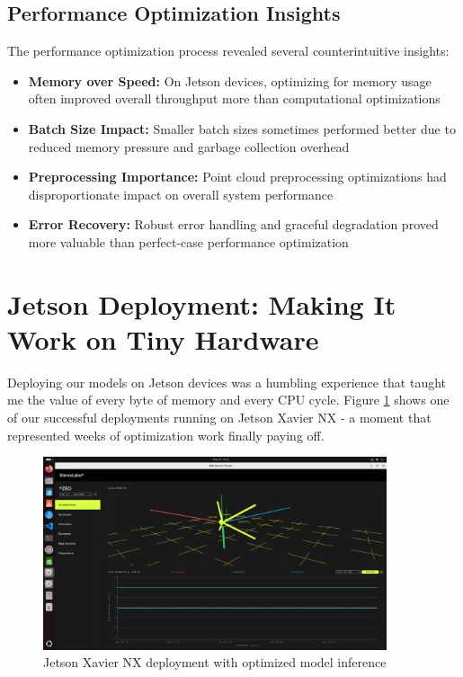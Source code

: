 \documentclass[12pt,a4paper]{report}
\begin{document}
\subsection{Performance Optimization Insights}

The performance optimization process revealed several counterintuitive insights:

\begin{itemize}
    \item \textbf{Memory over Speed:} On Jetson devices, optimizing for memory usage often improved overall throughput more than computational optimizations
    \item \textbf{Batch Size Impact:} Smaller batch sizes sometimes performed better due to reduced memory pressure and garbage collection overhead
    \item \textbf{Preprocessing Importance:} Point cloud preprocessing optimizations had disproportionate impact on overall system performance
    \item \textbf{Error Recovery:} Robust error handling and graceful degradation proved more valuable than perfect-case performance optimization
\end{itemize}

\section{Jetson Deployment: Making It Work on Tiny Hardware}

Deploying our models on Jetson devices was a humbling experience that taught me the value of every byte of memory and every CPU cycle. Figure \ref{fig:jetson_deployment} shows one of our successful deployments running on Jetson Xavier NX - a moment that represented weeks of optimization work finally paying off.

\begin{figure}[htbp]
    \centering
    \includegraphics[width=0.9\textwidth]{figures/zed_deployment.png}
    \caption{Jetson Xavier NX deployment with optimized model inference}
    \label{fig:jetson_deployment}
\end{figure}
\end{document}
